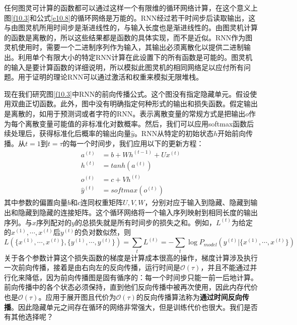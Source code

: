 \documentclass{ctexart}
\begin{document}
        任何图灵可计算的函数都可以通过这样一个有限维的循环网络计算，在这个意义上图\ref{f10.3}和公式\ref{e10.8}的循环网络是万能的。RNN经过若干时间步后读取输出，这与由图灵机所用时间步是渐进线性的，与输入长度也是渐进线性的。由图灵机计算的函数是离散的，所以这些结果都是函数的具体实现，而不是近似。RNN作为图灵机使用时，需要一个二进制序列作为输入，其输出必须离散化以提供二进制输出。利用单个有限大小的特定RNN计算在此设置下的所有函数是可能的。图灵机的输入是要计算函数的详细说明，所以模拟此图灵机的相同网络足以应付所有问题。用于证明的理论RNN可以通过激活和权重来模拟无限堆栈。

        现在我们研究图\ref{f10.3}中RNN的前向传播公式。这个图没有指定隐藏单元。假设使用双曲正切函数。此外，图中没有明确指定何种形式的输出和损失函数。假定输出是离散的，如用于预测词或者字符的RNN。表示离散变量的常规方式是把输出$o$作为每个离散变量可能值的非标准化对数概率。然后，我们可以应用softmax函数后续处理后，获得标准化后概率的输出向量$\hat{y}$。RNN从特定的初始状态$h$开始前向传播。从$t=1$到$t=\tau$的每一个时间步，我们应用以下的更新方程：
        \begin{equation}
            \begin{split}
                a^{(t)} &= b + Wh^{(t-1)} + U x^{(t)} \\
                h^{(t)} &= tanh(a^{(t)}) \\
                o^{(t)} &= c + Vh^{(t)} \\
                \hat{y}^{(t)} &= softmax(o^{(t)})
            \end{split}
            \label{e10.8}
        \end{equation}
        其中参数的偏置向量$b$和$c$连同权重矩阵$U,V,W$，分别对应于输入到隐藏、隐藏到输出和隐藏到隐藏的连接矩阵。这个循环网络将一个输入序列映射到相同长度的输出序列。与$x$序列配对的$y$的总损失就是所有时间步的损失之和。例如，$L^{(t)}$为给定的$x^{(1)},\cdots,x^{(t)}$后$y^{(t)}$的负对数似然，则
        \begin{equation}
            L(\{x^{(1)},\cdots,x^{(t)}\},\{y^{(1)},\cdots,y^{(t)}\}) = \sum_t L^{(t)} = - \sum_t \log P_{model} (y^{(t)}|\{x^{(1)},\cdots,x^{(t)}\})
            \label{e10.12}
        \end{equation}
        关于各个参数计算这个损失函数的梯度是计算成本很高的操作，梯度计算涉及执行一次前向传播，接着是由右向左的反向传播，运行时间是$\mathcal{O}(\tau)$，并且不能通过并行化来降低，因为前向传播图是固有循序的：每一个时间步只能一前一后地计算。前向传播中的各个状态必须保持，直到他们反向传播中被再次使用，因此内存代价也是$\mathcal{O}(\tau)$。应用于展开图且代价为$\mathcal{O}(\tau)$的反向传播算法称为\textbf{通过时间反向传播}。因此隐藏单元之间存在循环的网络非常强大，但是训练代价也很大。我们是否有其他选择呢？
\end{document}
